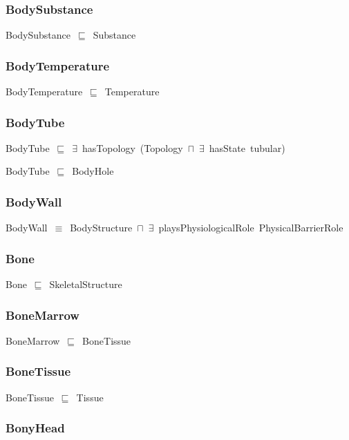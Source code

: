 \documentclass{article}
\begin{document}
\subsubsection*{BodySubstance}

BodySubstance~\ensuremath{\sqsubseteq}~Substance~

\subsubsection*{BodyTemperature}

BodyTemperature~\ensuremath{\sqsubseteq}~Temperature~

\subsubsection*{BodyTube}

BodyTube~\ensuremath{\sqsubseteq}~\ensuremath{\exists}~hasTopology~(Topology~\ensuremath{\sqcap}~\ensuremath{\exists}~hasState~tubular)~

BodyTube~\ensuremath{\sqsubseteq}~BodyHole~

\subsubsection*{BodyWall}

BodyWall~\ensuremath{\equiv}~BodyStructure~\ensuremath{\sqcap}~\ensuremath{\exists}~playsPhysiologicalRole~PhysicalBarrierRole

\subsubsection*{Bone}

Bone~\ensuremath{\sqsubseteq}~SkeletalStructure~

\subsubsection*{BoneMarrow}

BoneMarrow~\ensuremath{\sqsubseteq}~BoneTissue~

\subsubsection*{BoneTissue}

BoneTissue~\ensuremath{\sqsubseteq}~Tissue~

\subsubsection*{BonyHead}
\end{document}
